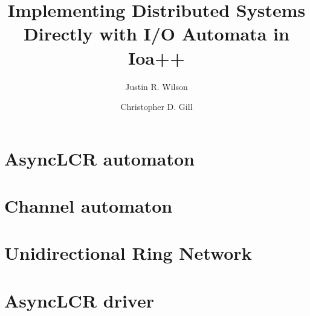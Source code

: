 \documentclass[letterpaper]{article}
\begin{document}
\title{Implementing Distributed Systems Directly with I/O Automata in Ioa++}
\author{Justin R. Wilson \and Christopher D. Gill}
\date{}

\maketitle

















{}


\appendix

\section{AsyncLCR automaton\label{asynch_lcr}}



\section{Channel automaton\label{channel}}



\section{Unidirectional Ring Network\label{ring}}



\section{AsyncLCR driver\label{driver}}


\end{document}
